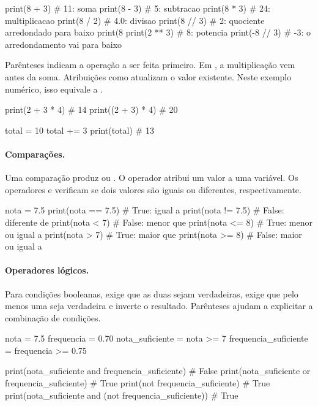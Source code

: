 \begin{exemplo}
print(8 + 3)   # 11: soma
print(8 - 3)   # 5: subtracao
print(8 * 3)   # 24: multiplicacao
print(8 / 2)   # 4.0: divisao
print(8 // 3)  # 2: quociente arredondado para baixo
print(8 %
print(2 ** 3)  # 8: potencia
print(-8 // 3) # -3: o arredondamento vai para baixo
\end{exemplo}

Parênteses indicam a operação a ser feita primeiro. Em , a multiplicação vem antes da soma. Atribuições como  atualizam o valor existente. Neste exemplo numérico, isso equivale a .

\begin{exemplo}
print(2 + 3 * 4)    # 14
print((2 + 3) * 4)  # 20

total = 10
total += 3
print(total)       # 13
\end{exemplo}

\paragraph{Comparações.}
Uma comparação produz  ou . O operador \codigo{=} atribui um valor a uma variável. Os operadores \codigo{==} e \codigo{!=} verificam se dois valores são iguais ou diferentes, respectivamente.

\begin{exemplo}
nota = 7.5
print(nota == 7.5)  # True: igual a
print(nota != 7.5)  # False: diferente de
print(nota < 7)     # False: menor que
print(nota <= 8)    # True: menor ou igual a
print(nota > 7)     # True: maior que
print(nota >= 8)    # False: maior ou igual a
\end{exemplo}

\paragraph{Operadores lógicos.}
Para condições booleanas,  exige que as duas sejam verdadeiras,  exige que pelo menos uma seja verdadeira e  inverte o resultado. Parênteses ajudam a explicitar a combinação de condições.

\begin{exemplo}
nota = 7.5
frequencia = 0.70
nota_suficiente = nota >= 7
frequencia_suficiente = frequencia >= 0.75

print(nota_suficiente and frequencia_suficiente)  # False
print(nota_suficiente or frequencia_suficiente)   # True
print(not frequencia_suficiente)                  # True
print(nota_suficiente and (not frequencia_suficiente))  # True
\end{exemplo}

